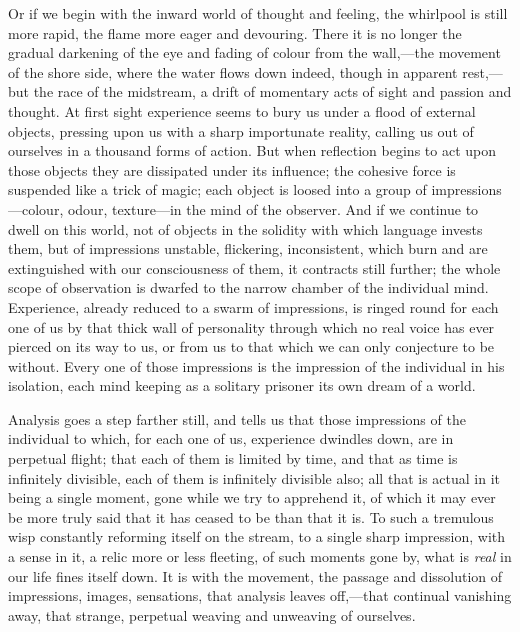 Or if we begin with the inward world of thought and feeling, the
whirlpool is still more rapid, the flame more eager and devouring. There
it is no longer the gradual darkening of the eye and fading of colour
from the wall,---the movement of the shore side, where the water flows
down indeed, though in apparent rest,---but the race of the midstream, a
drift of momentary acts of sight and passion and thought. At first sight
experience seems to bury us under a flood of external objects, pressing
upon us with a sharp importunate reality, calling us out of ourselves in
a thousand forms of action. But when reflection begins to act upon those
objects they are dissipated under its influence; the cohesive force is
suspended like a trick of magic; each object is loosed into a group of
impressions---colour, odour, texture---in the mind of the observer. And
if we continue to dwell on this world, not of objects in the solidity
with which language invests them, but of impressions unstable,
flickering, inconsistent, which burn and are extinguished with our
consciousness of them, it contracts still further; the whole scope of
observation is dwarfed to the narrow chamber of the individual mind.
Experience, already reduced to a swarm of impressions, is ringed round
for each one of us by that thick wall of personality through which no
real voice has ever pierced on its way to us, or from us to that which
we can only conjecture to be without. Every one of those impressions is
the impression of the individual in his isolation, each mind keeping as
a solitary prisoner its own dream of a world.

Analysis goes a step farther still, and tells us that those impressions
of the individual to which, for each one of us, experience dwindles
down, are in perpetual flight; that each of them is limited by time, and
that as time is infinitely divisible, each of them is infinitely
divisible also; all that is actual in it being a single moment, gone
while we try to apprehend it, of which it may ever be more truly said
that it has ceased to be than that it is. To such a tremulous wisp
constantly reforming itself on the stream, to a single sharp impression,
with a sense in it, a relic more or less fleeting, of such moments gone
by, what is \emph{real} in our life fines itself down. It is with the
movement, the passage and dissolution of impressions, images,
sensations, that analysis leaves off,---that continual vanishing away,
that strange, perpetual weaving and unweaving of ourselves.

